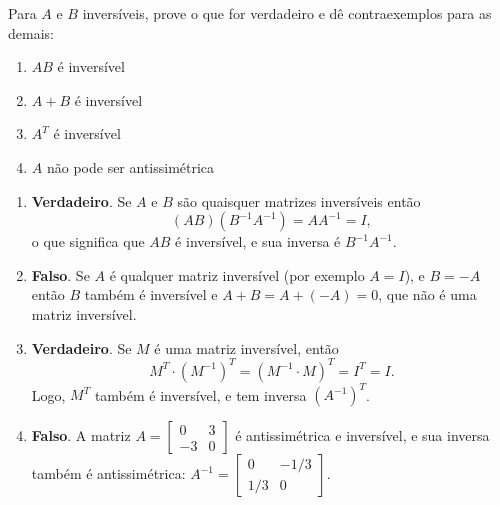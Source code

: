 \documentclass[12pt,a4paper]{article}
\begin{document}
\begin{ExerciseList}
\Exercise[title={1,8}]
Para $A$ e $B$ inversíveis, prove o que for verdadeiro e dê contraexemplos para as demais:

\begin{multicols}{2}
\begin{enumerate}
\item $AB$ é inversível
\item $A+B$ é inversível
\item $A^T$ é inversível
\item $A$ não pode ser antissimétrica
\end{enumerate}
\end{multicols}
\Answer
\begin{enumerate}
\item \textbf{Verdadeiro}. Se $A$ e $B$ são quaisquer matrizes inversíveis então
\[(AB)(B^{-1}A^{-1}) = A A^{-1} = I,\]
o que significa que $AB$ é inversível, e sua inversa é $B^{-1}A^{-1}$.
\item \textbf{Falso}. Se $A$ é qualquer matriz inversível (por exemplo $A=I$), e $B = -A$ então $B$ também é inversível e $A + B = A+(-A) = 0$, que não é uma matriz inversível.
\item \textbf{Verdadeiro}. Se $M$ é uma matriz inversível, então
\[
M^T \cdot (M^{-1})^T
= (M^{-1} \cdot M)^T
= I^T
= I.
\]
Logo, $M^T$ também é inversível, e tem inversa $(A^{-1})^T$.
\item \textbf{Falso}. A matriz $A = \begin{bmatrix}
0 & 3\\
-3 & 0
\end{bmatrix}$ é antissimétrica e inversível, e sua inversa também é antissimétrica: $A^{-1} = \begin{bmatrix}
0 & -1/3 \\1/3 & 0
\end{bmatrix}$.
\end{enumerate}




\end{ExerciseList}
\end{document}
